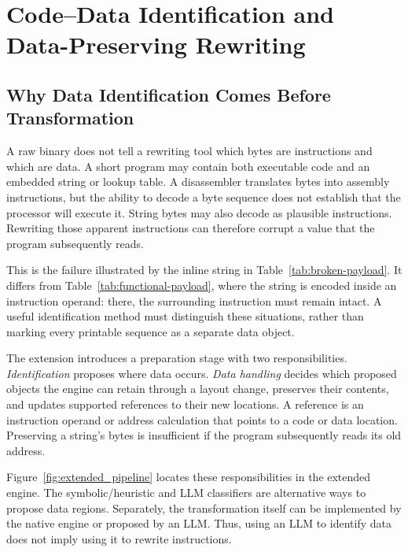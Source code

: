 \section{Code--Data Identification and Data-Preserving Rewriting}
\label{sec:code_data}
\subsection{Why Data Identification Comes Before Transformation}
A raw binary does not tell a rewriting tool which bytes are instructions
and which are data. A short program may contain both executable code and
an embedded string or lookup table. A disassembler translates bytes into
assembly instructions, but the ability to decode a byte sequence does not
establish that the processor will execute it. String bytes may also decode
as plausible instructions. Rewriting those apparent instructions can
therefore corrupt a value that the program subsequently reads.

This is the failure illustrated by the inline string in
Table~\ref{tab:broken-payload}. It differs from
Table~\ref{tab:functional-payload}, where the string is encoded inside an
instruction operand: there, the surrounding instruction must remain
intact. A useful identification method must distinguish these situations,
rather than marking every printable sequence as a separate data object.

The extension introduces a preparation stage with two responsibilities.
\emph{Identification} proposes where data occurs. \emph{Data handling}
decides which proposed objects the engine can retain through a layout
change, preserves their contents, and updates supported references
to their new locations. A reference is an instruction operand or address
calculation that points to a code or data location. Preserving a string's
bytes is insufficient if the program subsequently reads its old address.

Figure~\ref{fig:extended_pipeline} locates these responsibilities in the
extended engine. The symbolic/heuristic and LLM classifiers are alternative
ways to propose data regions. Separately, the transformation itself can be
implemented by the native engine or proposed by an LLM. Thus, using an LLM
to identify data does not imply using it to rewrite instructions.

